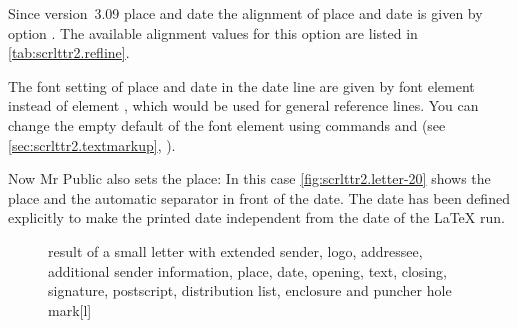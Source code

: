 Since version~3.09 place and date the
alignment of place and date is given by option . The available
alignment values for this option are listed in \autoref{tab:scrlttr2.refline}.

%
The font setting of place and date in the
date line are given by font
element
instead of element , which would be used for general
reference lines. You can change the empty default of the font element using
commands  and  (see
\autoref{sec:scrlttr2.textmarkup},
).%
%

\begin{Example}
  Now Mr Public also sets the place:%
  In this case \autoref{fig:scrlttr2.letter-20} shows the place and the
  automatic separator in front of the date. The date has been defined
  explicitly to make the printed date independent from the date of the
  \LaTeX{} run.
  \begin{figure}
    \setcapindent{0pt}%
    \begin{captionbeside}
      {result of a small letter with extended sender, logo, addressee,
        additional sender information, place, date, opening, text, closing,
        signature, postscript, distribution list, enclosure and puncher hole
        mark}[l]
    \end{captionbeside}
    \label{fig:scrlttr2.letter-20}
  \end{figure}
\end{Example}
%
%
%
%
%
%
%
%
%
%
%

